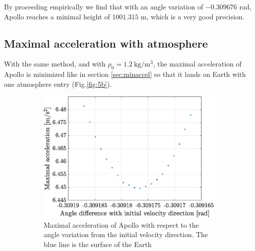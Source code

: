 \documentclass[a4paper,12pt,twoside]{article}
\begin{document}
By proceeding empirically we find that with an angle variation of $-0.309676$ rad, Apollo reaches a minimal height of $1001.315$ m, which is a very good precision.

\subsection{Maximal acceleration with atmosphere}
With the same method, and with $\rho_0 = 1.2 ~\si{\kg \per \m^3}$, the maximal acceleration of Apollo is minimized like in section \ref{sec:minaccel} so that it lands on Earth with one atmosphere entry (Fig.\ref{fig:5b}).

\begin{figure}[h]
  \centering
  \begin{subfigure}[t]{0.47\textwidth}
    \includegraphics[width=\textwidth]{graphs/ex5b_accel.eps}
    \caption{Maximal acceleration of Apollo with respect to the angle variation from the initial velocity direction. The blue line is the surface of the Earth}
    \label{fig:5b_amax}
  \end{subfigure}
  ~
  \begin{subfigure}[t]{0.5\textwidth}

\end{subfigure}
\end{figure}
\end{document}
